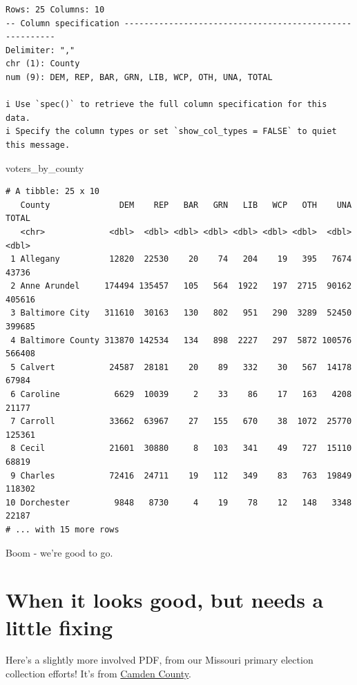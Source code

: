 \documentclass[
  letterpaper,
  DIV=11,
  numbers=noendperiod]{scrreprt}
\newenvironment{Shaded}{\begin{snugshade}}{\end{snugshade}}
\newcommand{\NormalTok}[1]{\textcolor[rgb]{0.00,0.23,0.31}{#1}}
\begin{document}
\begin{verbatim}
Rows: 25 Columns: 10
-- Column specification --------------------------------------------------------
Delimiter: ","
chr (1): County
num (9): DEM, REP, BAR, GRN, LIB, WCP, OTH, UNA, TOTAL

i Use `spec()` to retrieve the full column specification for this data.
i Specify the column types or set `show_col_types = FALSE` to quiet this message.
\end{verbatim}

\begin{Shaded}
\begin{Highlighting}[]
\NormalTok{voters\_by\_county}
\end{Highlighting}
\end{Shaded}

\begin{verbatim}
# A tibble: 25 x 10
   County              DEM    REP   BAR   GRN   LIB   WCP   OTH    UNA  TOTAL
   <chr>             <dbl>  <dbl> <dbl> <dbl> <dbl> <dbl> <dbl>  <dbl>  <dbl>
 1 Allegany          12820  22530    20    74   204    19   395   7674  43736
 2 Anne Arundel     174494 135457   105   564  1922   197  2715  90162 405616
 3 Baltimore City   311610  30163   130   802   951   290  3289  52450 399685
 4 Baltimore County 313870 142534   134   898  2227   297  5872 100576 566408
 5 Calvert           24587  28181    20    89   332    30   567  14178  67984
 6 Caroline           6629  10039     2    33    86    17   163   4208  21177
 7 Carroll           33662  63967    27   155   670    38  1072  25770 125361
 8 Cecil             21601  30880     8   103   341    49   727  15110  68819
 9 Charles           72416  24711    19   112   349    83   763  19849 118302
10 Dorchester         9848   8730     4    19    78    12   148   3348  22187
# ... with 15 more rows
\end{verbatim}

Boom - we're good to go.

\hypertarget{when-it-looks-good-but-needs-a-little-fixing}{%
\section{When it looks good, but needs a little
fixing}\label{when-it-looks-good-but-needs-a-little-fixing}}

Here's a slightly more involved PDF, from our Missouri primary election
collection efforts! It's from
\href{https://drive.google.com/file/d/1PcsvFpkulCZUM6bnEM74cttf3W0WWC0U/view?usp=sharing}{Camden
County}.
\end{document}

